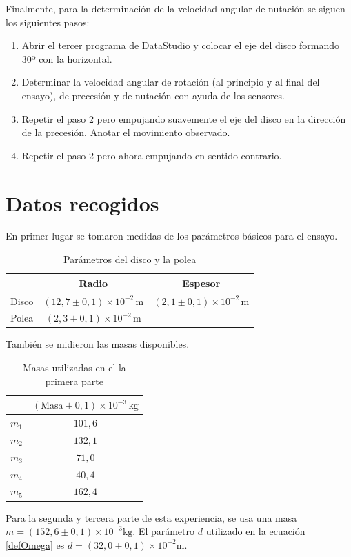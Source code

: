 \documentclass[a4paper]{article}
\begin{document}
Finalmente, para la determinación de la velocidad angular de nutación se siguen los siguientes pasos:
\begin{enumerate}
\item Abrir el tercer programa de DataStudio y colocar el eje del disco formando 30º con la horizontal.
\item Determinar la velocidad angular de rotación (al principio y al final del ensayo), de precesión y de nutación con ayuda de los sensores.
\item Repetir el paso 2 pero empujando suavemente el eje del disco en la dirección de la precesión. Anotar el movimiento observado.
\item Repetir el paso 2 pero ahora empujando en sentido contrario.
\end{enumerate}
\section{Datos recogidos}
En primer lugar se tomaron medidas de los parámetros básicos para el ensayo. 
\begin{table}[h]
\begin{center}
\begin{tabular}{|c|c|c|}
\cline{2-3}
\multicolumn{1}{c|}{}& Radio & Espesor\\
\hline
Disco&$\left(12,7\pm 0,1\right)\times 10^{-2}\,\text{m}$&$\left(2,1\pm 0,1\right)\times 10^{-2}\,\text{m}$\\
\hline
Polea&$\left(2,3\pm 0,1\right)\times 10^{-2}\,\text{m}$&\multicolumn{1}{c}{}\\
\cline{1-2}
\end{tabular}
\caption{Parámetros del disco y la polea}
\end{center}
\end{table}
También se midieron las masas disponibles.
\begin{table}[h]
\begin{center}
\begin{tabular}{|c|c|}
\cline{2-2}
\multicolumn{1}{c|}{}&$\left( \text{Masa}\pm 0,1\right) \times 10^{-3}\,\text{kg}$\\ \hline
$m_1$&$101,6$\\ \hline
$m_2$&$132,1$\\ \hline
$m_3$&$71,0$\\ \hline
$m_4$&$40,4$\\ \hline
$m_5$&$162,4$\\ \hline
\end{tabular}
\caption{Masas utilizadas en el la primera parte}
\end{center}
\end{table}
Para la segunda y tercera parte de esta experiencia, se usa una masa $m=\left(152,6\pm 0,1\right)\times 10^{-3} \text{kg}$. El parámetro $d$ utilizado en la ecuación \ref{defOmega} es $d=\left(32,0\pm 0,1\right)\times 10^{-2} \text{m}$. 
\end{document}
